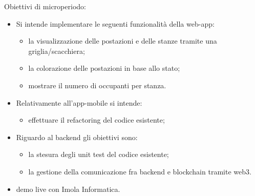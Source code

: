 Obiettivi di microperiodo:






\begin{itemize}
	\item Si intende implementare le seguenti funzionalità della web-app:
	\begin{itemize}
		\item la visualizzazione delle postazioni e delle stanze tramite una griglia/scacchiera; 
		\item la colorazione delle postazioni in base allo stato;
		\item mostrare il numero di occupanti per stanza.
	\end{itemize}
	\item Relativamente all'app-mobile si intende:
	\begin{itemize}
		\item effettuare il refactoring del codice esistente;
	\end{itemize}
	\item Riguardo al backend gli obiettivi sono:
	\begin{itemize}
		\item la stesura degli unit test del codice esistente;
		\item la gestione della comunicazione fra backend e blockchain tramite web3.
	\end{itemize}





\item demo live con Imola Informatica.
\end{itemize}